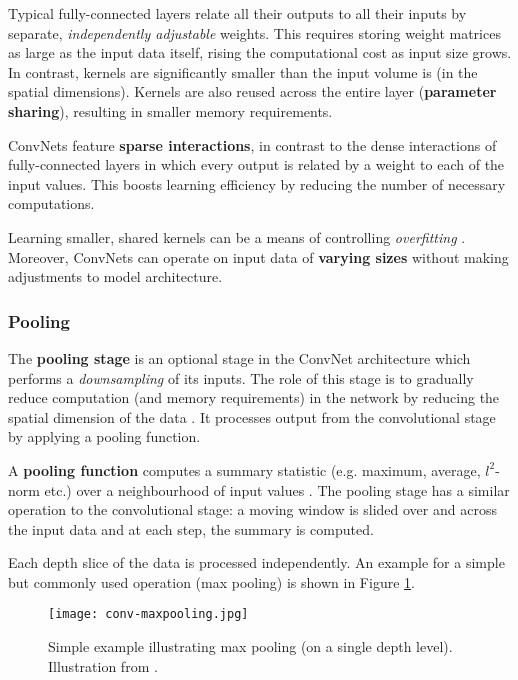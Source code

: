 Typical fully-connected layers relate all their outputs to all their inputs by separate, \emph{independently adjustable} weights.
This requires storing weight matrices as large as the input data itself, rising the computational cost as input size grows.
In contrast, kernels are significantly smaller than the input volume is (in the spatial dimensions).
Kernels are also reused across the entire layer (\textbf{parameter sharing}), resulting in smaller memory requirements.

ConvNets feature \textbf{sparse interactions}, in contrast to the dense interactions of fully-connected layers in which every output is related by a weight to each of the input values.
This boosts learning efficiency by reducing the number of necessary computations.

Learning smaller, shared kernels can be a means of controlling \emph{overfitting} \cite{Goodfellow-et-al-2016}. Moreover, ConvNets can operate on input data of \textbf{varying sizes} without making adjustments to model architecture.


\subsubsection{Pooling}
The \textbf{pooling stage} is an optional stage in the ConvNet architecture which performs a \emph{downsampling} of its inputs.
The role of this stage is to gradually reduce computation (and memory requirements) in the network by reducing the spatial dimension of the data \cite{stanford-convnets}.
It processes output from the convolutional stage by applying a pooling function.

A \textbf{pooling function} computes a summary statistic (e.g. maximum, average, $l^2$-norm etc.) over a neighbourhood of input values \cite{Goodfellow-et-al-2016}.
The pooling stage has a similar operation to the convolutional stage:
a moving window is slided over and across the input data and at each step, the summary is computed.

Each depth slice of the data is processed independently.
An example for a simple but commonly used operation (max pooling) is shown in Figure \ref{fig:maxpooling}.

\begin{figure}[h]
    \centering
    \texttt{[image: conv-maxpooling.jpg]}
    \caption{Simple example illustrating max pooling (on a single depth level). Illustration from \cite{stanford-convnets}.}
    \label{fig:maxpooling}
\end{figure}


